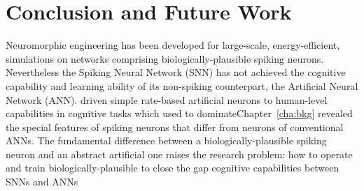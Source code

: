 \chapter{Conclusion and Future Work}
\label{cha:conc}
Neuromorphic engineering has been developed for large-scale, energy-efficient, simulations on networks comprising \DIFdelbegin {}\DIFdelend biologically-plausible spiking neurons.
Nevertheless the Spiking Neural Network (SNN) has not achieved the cognitive capability and learning ability of its non-spiking counterpart, the Artificial Neural Network (ANN).
\DIFdelbegin {}\DIFdelend \DIFaddbegin {}\DIFaddend driven simple rate-based artificial neurons to \DIFdelbegin {}\DIFdelend \DIFaddbegin {}\DIFaddend human-level capabilities in cognitive tasks which \DIFdelbegin {}\DIFdelend \DIFaddbegin {}\DIFaddend used to dominate\DIFdelbegin {}\DIFdelend \DIFaddbegin {}\DIFaddend Chapter~\ref{cha:bkg} \DIFdelbegin {}\DIFdelend revealed the special features of spiking neurons that differ from \DIFaddbegin {}\DIFaddend neurons of conventional ANNs.
The fundamental difference between a biologically-plausible spiking neuron and an abstract artificial one raises the research problem: \DIFaddbegin {}\DIFaddend how to operate and train \DIFdelbegin {}\DIFdelend biologically-plausible \DIFdelbegin {}\DIFdelend \DIFaddbegin {}\DIFaddend to close the gap \DIFdelbegin {}\DIFdelend \DIFaddbegin {}\DIFaddend cognitive capabilities between SNNs and ANNs \DIFdelbegin {}\DIFdelend \DIFaddbegin {}\DIFaddend 

